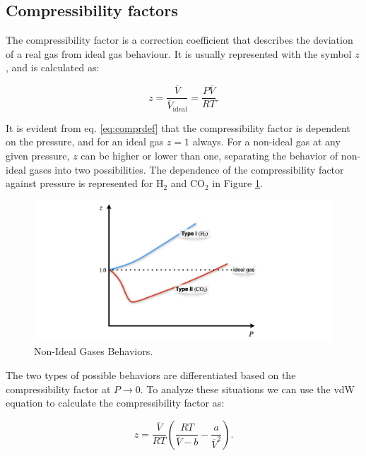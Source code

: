 \documentclass[
  9pt,
]{extbook}
\theoremstyle{definition}
\theoremstyle{definition}
\theoremstyle{definition}
\theoremstyle{remark}
\begin{document}
\hypertarget{compressibility-factors}{%
\subsection{Compressibility factors}\label{compressibility-factors}}

The compressibility factor is a correction coefficient that describes the deviation of a real gas from ideal gas behaviour. It is usually represented with the symbol \(z\), and is calculated as:

\begin{equation}
z=\frac{\overline{V}}{\overline{V}_{\text{ideal}}} = \frac{P \overline{V}}{RT}.
\label{eq:comprdef}
\end{equation}

It is evident from eq. \eqref{eq:comprdef} that the compressibility factor is dependent on the pressure, and for an ideal gas \(z=1\) always. For a non-ideal gas at any given pressure, \(z\) can be higher or lower than one, separating the behavior of non-ideal gases into two possibilities. The dependence of the compressibility factor against pressure is represented for \(\mathrm{H}_2\) and \(\mathrm{CO}_2\) in Figure \ref{fig:FigZb}.

\begin{figure}

{\centering \includegraphics[width=0.8\linewidth]{./img/OEP_Figures.012} 

}

\caption{Non-Ideal Gases Behaviors.}\label{fig:FigZb}
\end{figure}

The two types of possible behaviors are differentiated based on the compressibility factor at \(P\rightarrow 0\). To analyze these situations we can use the vdW equation to calculate the compressibility factor as:

\begin{equation}
z= \frac{\overline{V}}{RT} \left( \frac{RT}{\overline{V}-b} -\frac{a}{\overline{V}^2} \right).
\label{eq:compr1}
\end{equation}
\end{document}
